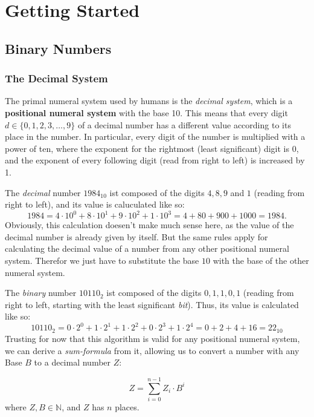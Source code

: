 \chapter{Getting Started}

\section{Binary Numbers}

\subsection{The Decimal System}

The primal numeral system used by humans is the \emph{decimal system}, which is a \textbf{positional numeral system} with the base 10.
This means that every digit $d \in \{0,1,2,3,\ldots,9\}$ of a decimal number has a different value according to its place in the number.
In particular, every digit of the number is multiplied with a power of ten, where the exponent for the rightmost (least significant) digit is 0, and the exponent of every following digit (read from right to left) is increased by 1.

The \emph{decimal} number $1984_{10}$ ist composed of the digits $4,8,9$ and $1$ (reading from right to left), and its value is caluculated like so:
\begin{equation*}
1984=4\cdot10^0+8\cdot10^1+9\cdot10^2+1\cdot10^3=4+80+900+1000=1984.
\end{equation*}
Obviously, this calculation doesen't make much sense here, as the value of the decimal number is already given by itself.
But the same rules apply for calculating the decimal value of a number from any other positional numeral system.
Therefor we just have to substitute the base $10$ with the base of the other numeral system.

The \emph{binary} number $10110_2$ ist composed of the digits $0,1,1,0,1$ (reading from right to left, starting with the least significant \emph{bit}). 
Thus, its value is calculated like so:
\begin{equation*}
10110_2=0\cdot2^0+1\cdot2^1+1\cdot2^2+0\cdot2^3+1\cdot2^4=0+2+4+16=22_{10}
\end{equation*}
Trusting for now that this algorithm is valid for any positional numeral system, we can derive a \emph{sum-formula} from it, allowing us to convert a number with any Base $B$ to a decimal number $Z$:

\begin{equation} \label{eq:sum}
\boxed{Z=\sum_{i=0}^{n-1} Z_i \cdot B^i}
\end{equation}
where $Z,B \in \mathbb{N}$, and $Z$ has $n$ places.

